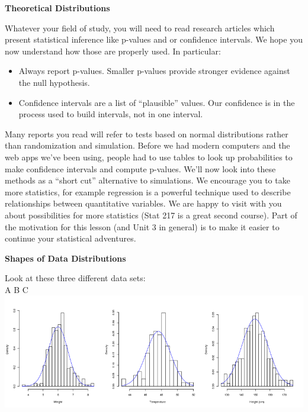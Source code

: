 \def\theTopic{Normal and t Distributions }
\def\dayNum{20 }

 \begin{center}
 {\bf {\large Theoretical Distributions}}
 \end{center}

  Whatever your field of study, you will need to read  research
  articles which present statistical inference like p-values and or
  confidence intervals.  We hope you now understand how those are
  properly used. In particular:
  \begin{itemize}
  \item Always report p-values. Smaller p-values provide stronger
    evidence against the null hypothesis.
  \item Confidence intervals are a list of ``plausible'' values.
    Our confidence is in the process used to build intervals, not
    in one interval. 
  \end{itemize}

  Many reports you read will refer to tests based on normal
  distributions rather than randomization and simulation.
  Before we had modern computers and the web apps we've been using,
  people had to use tables to look up probabilities to make confidence
  intervals and compute p-values.  We'll now look into these methods
  as a ``short cut'' alternative to simulations.
  We encourage you to take more statistics, for example regression 
  is a powerful technique used to describe relationships between
  quantitative variables.    We are happy to visit with you
  about possibilities for more statistics (Stat 217 is a great second
  course).  Part of the motivation for this lesson (and Unit 3 in
  general)  is to make it easier to
  continue your statistical adventures.

 
 \begin{center}
   {\Large\bf  Shapes of Data Distributions}
 \end{center}

  Look at these three different data sets:\\
\hspace*{2.6cm}A  \hspace*{5cm}B  \hspace*{4.5cm}C \\
\includegraphics[width=.9\linewidth]{plots/normals.png}

